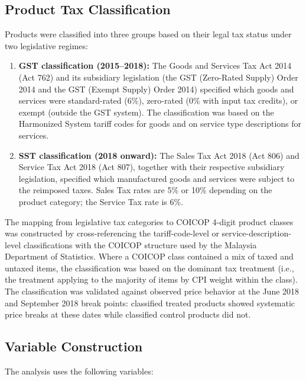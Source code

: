 \documentclass[12pt]{article}
\begin{document}
\subsection{Product Tax Classification}

Products were classified into three groups based on their legal tax status under two legislative regimes:

\begin{enumerate}
\item \textbf{GST classification (2015--2018):} The Goods and Services Tax Act 2014 (Act 762) and its subsidiary legislation (the GST (Zero-Rated Supply) Order 2014 and the GST (Exempt Supply) Order 2014) specified which goods and services were standard-rated (6\%), zero-rated (0\% with input tax credits), or exempt (outside the GST system). The classification was based on the Harmonized System tariff codes for goods and on service type descriptions for services.

\item \textbf{SST classification (2018 onward):} The Sales Tax Act 2018 (Act 806) and Service Tax Act 2018 (Act 807), together with their respective subsidiary legislation, specified which manufactured goods and services were subject to the reimposed taxes. Sales Tax rates are 5\% or 10\% depending on the product category; the Service Tax rate is 6\%.
\end{enumerate}

The mapping from legislative tax categories to COICOP 4-digit product classes was constructed by cross-referencing the tariff-code-level or service-description-level classifications with the COICOP structure used by the Malaysia Department of Statistics. Where a COICOP class contained a mix of taxed and untaxed items, the classification was based on the dominant tax treatment (i.e., the treatment applying to the majority of items by CPI weight within the class). The classification was validated against observed price behavior at the June 2018 and September 2018 break points: classified treated products showed systematic price breaks at these dates while classified control products did not.

\subsection{Variable Construction}

The analysis uses the following variables:
\end{document}
